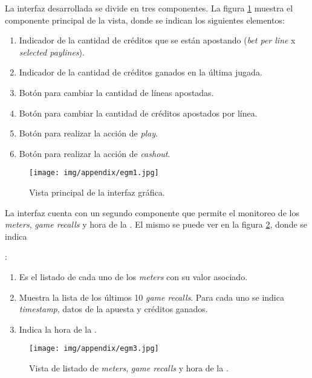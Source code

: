 La interfaz desarrollada se divide en tres componentes. La figura \ref{fig:appendix:egm1} muestra el componente principal de la vista, 
donde se indican los siguientes elementos:

\begin{enumerate}
 \item Indicador de la cantidad de cr\'editos que se est\'an apostando (\textit{bet per line}  x \textit{selected paylines}).
 \item Indicador de la cantidad de cr\'editos ganados en la \'ultima jugada.
 \item Bot\'on para cambiar la cantidad de l\'ineas apostadas.
 \item Bot\'on para cambiar la cantidad de cr\'editos apostados por l\'inea.
 \item Bot\'on para realizar la acci\'on de \textit{play}.
 \item Bot\'on para realizar la acci\'on de \textit{cashout}.
\end{enumerate}

\begin{figure}[ht!]
\centering
\texttt{[image: img/appendix/egm1.jpg]}
\caption{Vista principal de la interfaz gr\'afica.}
\label{fig:appendix:egm1}
\end{figure}


La interfaz cuenta con un segundo componente que permite el monitoreo de los \textit{meters}, \textit{game recalls} y hora de la \sm.
El mismo se puede ver en la figura \ref{fig:appendix:egm3}, donde se indica

:

\begin{enumerate}
 \item Es el listado de cada uno de los \textit{meters} con su valor asociado.
 \item Muestra la lista de los \'ultimos 10 \textit{game recalls}. Para cada uno se indica \textit{timestamp}, datos de la apuesta y cr\'editos ganados.
 \item Indica la hora de la \sm.
\end{enumerate}

\FloatBarrier

\begin{figure}[ht!]
\centering
\texttt{[image: img/appendix/egm3.jpg]}
\caption{Vista de listado de \textit{meters}, \textit{game recalls} y hora de la \sm.}
\label{fig:appendix:egm3}
\end{figure}

